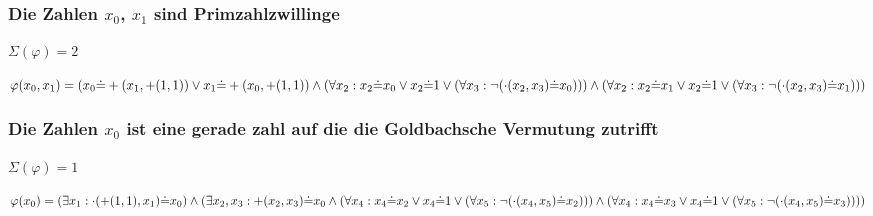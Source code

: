 \subsubsection*{Die Zahlen $x_0$, $x_1$ sind Primzahlzwillinge}
$\Sigma(\varphi) = 2$

$\varphi(x_0,x_1) = \\
(x_0 \dot{=} +(x_1,+(1,1)) \vee x_1 \dot{=} +(x_0,+(1,1)) \wedge \\
(\forall x_2: x_2 \dot{=} x_0 \vee x_2 \dot{=} 1 \vee (\forall x_3:\neg (\cdot(x_2,x_3) \dot{=} x_0) )) \wedge \\
(\forall x_2: x_2 \dot{=} x_1 \vee x_2 \dot{=} 1 \vee (\forall x_3:\neg (\cdot(x_2,x_3) \dot{=} x_1) )) 
$

\clearpage


\subsubsection*{Die Zahlen $x_0$ ist eine gerade zahl auf die die Goldbachsche Vermutung zutrifft}

$\Sigma(\varphi) = 1$

$\varphi(x_0) = \\
(\exists x_1: \cdot(+(1,1),x_1) \dot{=} x_0) \wedge \\
(\exists x_2, x_3 : +(x_2,x_3) \dot{=} x_0 \wedge \\
(\forall x_4: x_4 \dot{=} x_2 \vee x_4 \dot{=} 1 \vee (\forall x_5:\neg (\cdot(x_4,x_5) \dot{=} x_2) )) \wedge \\
(\forall x_4: x_4 \dot{=} x_3 \vee x_4 \dot{=} 1 \vee (\forall x_5:\neg (\cdot(x_4,x_5) \dot{=} x_3) )) 
)
$



